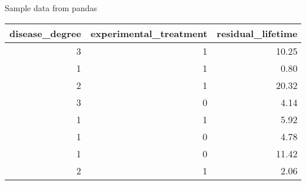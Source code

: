 \caption{Sample data from pandas}
\label{tab:sample_data}
\begin{tabular}{rrr}
\toprule
disease\_degree & experimental\_treatment & residual\_lifetime \\
\midrule
3 & 1 & 10.25 \\
1 & 1 & 0.80 \\
2 & 1 & 20.32 \\
3 & 0 & 4.14 \\
1 & 1 & 5.92 \\
1 & 0 & 4.78 \\
1 & 0 & 11.42 \\
2 & 1 & 2.06 \\
\bottomrule
\end{tabular}
